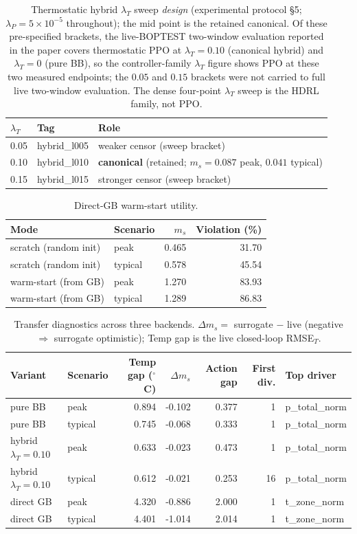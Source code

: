 \documentclass[11pt,a4paper]{article}
\begin{document}
\begin{table}[H]
\centering
\caption{Thermostatic hybrid $\lambda_T$ sweep \emph{design} (experimental protocol \S5; $\lambda_P=5\times10^{-5}$ throughout); the mid point is the retained canonical. Of these pre-specified brackets, the live-BOPTEST two-window evaluation reported in the paper covers thermostatic PPO at $\lambda_T=0.10$ (canonical hybrid) and $\lambda_T=0$ (pure BB), so the controller-family $\lambda_T$ figure shows PPO at these two measured endpoints; the $0.05$ and $0.15$ brackets were not carried to full live two-window evaluation. The dense four-point $\lambda_T$ sweep is the HDRL family, not PPO.}
\label{tab:hybrid_sweep}
\small
\begin{tabular}{lll}
\toprule
$\lambda_T$ & Tag & Role \\
\midrule
0.05 & hybrid\_l005 & weaker censor (sweep bracket) \\
0.10 & hybrid\_l010 & \textbf{canonical} (retained; $m_s=0.087$ peak, $0.041$ typical) \\
0.15 & hybrid\_l015 & stronger censor (sweep bracket) \\
\bottomrule
\end{tabular}
\end{table}
\begin{table}[H]
\centering
\caption{Direct-GB warm-start utility.}
\label{tab:warmstart}
\small
\begin{tabular}{llrr}
\toprule
Mode & Scenario & $m_s$ & Violation (\%) \\
\midrule
scratch (random init) & peak & 0.465 & 31.70 \\
scratch (random init) & typical & 0.578 & 45.54 \\
warm-start (from GB) & peak & 1.270 & 83.93 \\
warm-start (from GB) & typical & 1.289 & 86.83 \\
\bottomrule
\end{tabular}
\end{table}
\begin{table}[H]
\centering
\caption{Transfer diagnostics across three backends. $\Delta m_s=$ surrogate $-$ live (negative $\Rightarrow$ surrogate optimistic); Temp gap is the live closed-loop RMSE$_T$.}
\label{tab:transfer}
\small
\begin{tabular}{llrrrrl}
\toprule
Variant & Scenario & Temp gap ($^\circ$C) & $\Delta m_s$ & Action gap & First div. & Top driver \\
\midrule
pure BB & peak & 0.894 & -0.102 & 0.377 & 1 & p\_total\_norm \\
pure BB & typical & 0.745 & -0.068 & 0.333 & 1 & p\_total\_norm \\
hybrid $\lambda_T=0.10$ & peak & 0.633 & -0.023 & 0.473 & 1 & p\_total\_norm \\
hybrid $\lambda_T=0.10$ & typical & 0.612 & -0.021 & 0.253 & 16 & p\_total\_norm \\
direct GB & peak & 4.320 & -0.886 & 2.000 & 1 & t\_zone\_norm \\
direct GB & typical & 4.401 & -1.014 & 2.014 & 1 & t\_zone\_norm \\
\bottomrule
\end{tabular}
\end{table}
\end{document}
